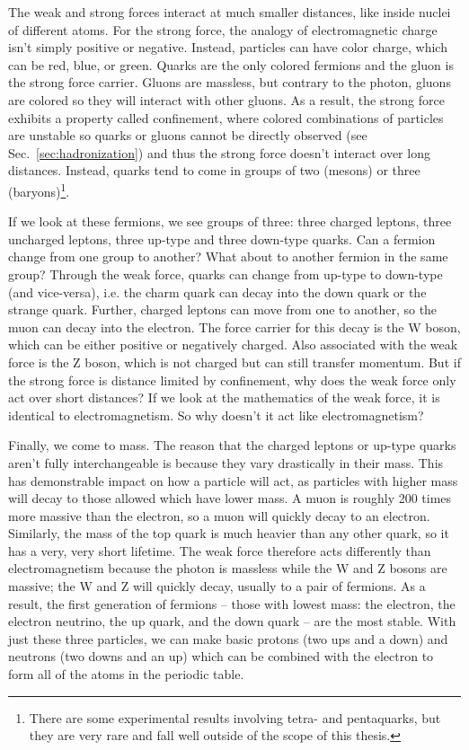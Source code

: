 The weak and strong forces interact at much smaller distances, like inside nuclei of different atoms. For the strong force, the analogy of electromagnetic charge isn't simply positive or negative. Instead, particles can have color charge, which can be red, blue, or green. Quarks are the only colored fermions and the gluon is the strong force carrier. Gluons are massless, but contrary to the photon, gluons are colored so they will interact with other gluons. As a result, the strong force exhibits a property called confinement, where colored combinations of particles are unstable so quarks or gluons cannot be directly observed (see Sec.~\ref{sec:hadronization}) and thus the strong force doesn't interact over long distances. Instead, quarks tend to come in groups of two (mesons) or three (baryons)\footnote{There are some experimental results involving tetra- and pentaquarks, but they are very rare and fall well outside of the scope of this thesis.}.

If we look at these fermions, we see groups of three: three charged leptons, three uncharged leptons, three up-type and three down-type quarks. Can a fermion change from one group to another? What about to another fermion in the same group? Through the weak force, quarks can change from up-type to down-type (and vice-versa), i.e. the charm quark can decay into the down quark or the strange quark. Further, charged leptons can move from one to another, so the muon can decay into the electron. The force carrier for this decay is the W boson, which can be either positive or negatively charged. Also associated with the weak force is the Z boson, which is not charged but can still transfer momentum. But if the strong force is distance limited by confinement, why does the weak force only act over short distances? If we look at the mathematics of the weak force, it is identical to electromagnetism. So why doesn't it act like electromagnetism?

Finally, we come to mass. The reason that the charged leptons or up-type quarks aren't fully interchangeable is because they vary drastically in their mass. This has demonstrable impact on how a particle will act, as particles with higher mass will decay to those allowed which have lower mass. A muon is roughly 200 times more massive than the electron, so a muon will quickly decay to an electron. Similarly, the mass of the top quark is much heavier than any other quark, so it has a very, very short lifetime. The weak force therefore acts differently than electromagnetism because the photon is massless while the W and Z bosons are massive; the W and Z will quickly decay, usually to a pair of fermions. As a result, the first generation of fermions -- those with lowest mass: the electron, the electron neutrino, the up quark, and the down quark -- are the most stable. With just these three particles, we can make basic protons (two ups and a down) and neutrons (two downs and an up) which can be combined with the electron to form all of the atoms in the periodic table.

